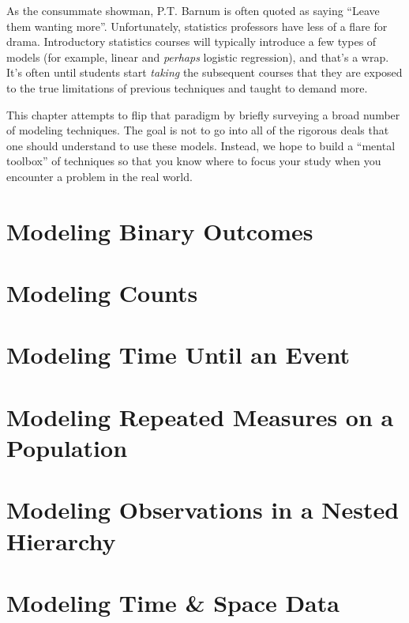\documentclass[
]{krantz}
\begin{document}
As the consummate showman, P.T. Barnum is often quoted as saying ``Leave them wanting more''. Unfortunately, statistics professors have less of a flare for drama. Introductory statistics courses will typically introduce a few types of models (for example, linear and \emph{perhaps} logistic regression), and that's a wrap. It's often until students start \emph{taking} the subsequent courses that they are exposed to the true limitations of previous techniques and taught to demand more.

This chapter attempts to flip that paradigm by briefly surveying a broad number of modeling techniques. The goal is not to go into all of the rigorous deals that one should understand to use these models. Instead, we hope to build a ``mental toolbox'' of techniques so that you know where to focus your study when you encounter a problem in the real world.

\hypertarget{modeling-binary-outcomes}{%
\section{Modeling Binary Outcomes}\label{modeling-binary-outcomes}}

\hypertarget{modeling-counts}{%
\section{Modeling Counts}\label{modeling-counts}}

\hypertarget{modeling-time-until-an-event}{%
\section{Modeling Time Until an Event}\label{modeling-time-until-an-event}}

\hypertarget{modeling-repeated-measures-on-a-population}{%
\section{Modeling Repeated Measures on a Population}\label{modeling-repeated-measures-on-a-population}}

\hypertarget{modeling-observations-in-a-nested-hierarchy}{%
\section{Modeling Observations in a Nested Hierarchy}\label{modeling-observations-in-a-nested-hierarchy}}

\hypertarget{modeling-time-space-data}{%
\section{Modeling Time \& Space Data}\label{modeling-time-space-data}}
\end{document}
